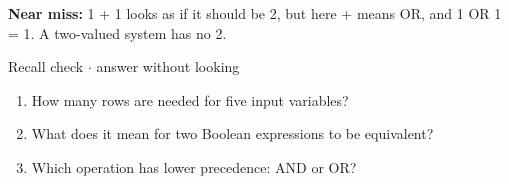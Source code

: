 \documentclass[11pt]{article}
\begin{document}
\begin{keepsection}
\begin{keepsection}
\begin{notebox}\textbf{Near miss:} 1 + 1 looks as if it should be 2, but here + means OR, and 1 OR 1 = 1. A two-valued system has no 2.\end{notebox}

\begin{recallbox}{Recall check \ensuremath{\cdot} answer without looking}
\begin{enumerate}
\item How many rows are needed for five input variables?
\item What does it mean for two Boolean expressions to be equivalent?
\item Which operation has lower precedence: AND or OR?
\end{enumerate}

\end{recallbox}
\end{keepsection}
\end{keepsection}
\end{document}
